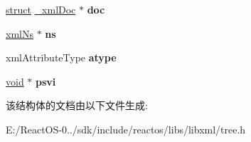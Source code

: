\begin{DoxyCompactItemize}
\item 
\mbox{\label{struct__xml_attr_ab2eb84cdffefadddcc48fc33b7ca2d75}} 
\hyperlink{interfacestruct}{struct} \hyperlink{struct__xml_doc}{\+\_\+xml\+Doc} $\ast$ {\bfseries doc}
\item 
\mbox{\label{struct__xml_attr_a065c43de84bfa24525a9d2b971cf0fae}} 
\hyperlink{struct__xml_ns}{xml\+Ns} $\ast$ {\bfseries ns}
\item 
\mbox{\label{struct__xml_attr_a95fc30b9d2f4df9ffc8ee24d5926c63c}} 
xml\+Attribute\+Type {\bfseries atype}
\item 
\mbox{\label{struct__xml_attr_a6b5d144ded807d5384ab9ad4cf129454}} 
\hyperlink{interfacevoid}{void} $\ast$ {\bfseries psvi}
\end{DoxyCompactItemize}


该结构体的文档由以下文件生成\+:\begin{DoxyCompactItemize}
\item 
E\+:/\+React\+O\+S-\/0../sdk/include/reactos/libs/libxml/tree.\+h\end{DoxyCompactItemize}
